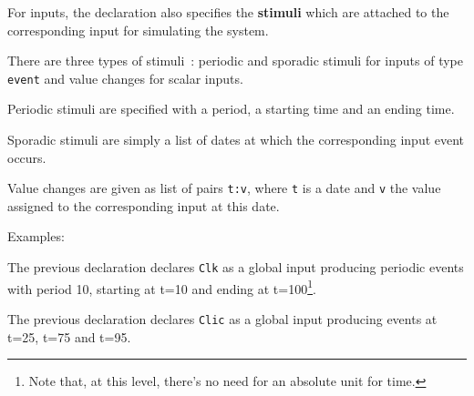 \step For inputs, the declaration also specifies the \textbf{stimuli} which are attached to the
corresponding input for simulating the system.
\begin{center}
\end{center}

There are three types of stimuli~:
periodic and
sporadic stimuli for inputs of type \verb|event| and value changes for scalar inputs.

\medskip
Periodic stimuli are specified with a period, a starting time and an ending time.

\begin{center}
\end{center}

Sporadic stimuli
are simply a list of dates at which the corresponding input event occurs.

\begin{center}
\end{center}

Value changes are given as
list of pairs \verb|t:v|, where \verb|t| is a date and \verb|v| the value assigned to the
corresponding input at this date. 

\begin{center}
\end{center}

\medskip
Examples:

\begin{center}
\end{center}

The previous declaration declares \verb|Clk| as a global input producing periodic events with period 10, starting
  at t=10 and ending at t=100\footnote{Note that, at this level, there's no need for an absolute
    unit for time.}.

\begin{center}
\end{center}

The previous declaration declares \verb|Clic| as a global input producing events at t=25, t=75 and
  t=95.

\begin{center}
\end{center}

